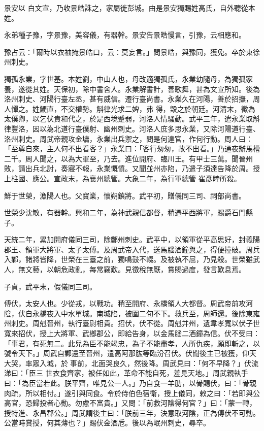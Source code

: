 \begin{pinyinscope}
 景安以
 白文宣，乃收景皓誅之，家屬徙彭城。由是景安獨賜姓高氏，自外聽從本姓。



 永弟種子豫，字景豫，美容儀，有器幹。景安告景皓慢言，引豫，云相應和。



 豫占云：「爾時以衣袖掩景皓口，云：莫妄言。」問景皓，與豫同，獲免。卒於東徐州刺史。



 獨孤永業，字世基。本姓劉，中山人也，母改適獨孤氏，永業幼隨母，為獨孤家養，遂從其姓。天保初，除中書舍人。永業解書計，善歌舞，甚為文宣所知。後為洛州刺史、河陽行臺左丞，甚有威信。遷行臺尚書。永業久在河陽，善於招撫，周人憚之。姓鯁直，不交權勢。斛律光求二婢，弗
 得，毀之於朝廷。河清末，徵為太僕卿，以乞伏貴和代之，於是西境蹙弱，河洛人情騷動。武平三年，遣永業取斛律豐洛，因以為北道行臺僕射、幽州刺史。河洛人庶多思永業，又除河陽道行臺、洛州刺史。周武帝親攻金墉，永業出兵禦之，問是何達官，作何行動。周人曰：「至尊自來，主人何不出看客？」永業曰：「客行匆匆，故不出看。」乃通夜辦馬槽二千。周人聞之，以為大軍至，乃去。進位開府、臨川王。有甲士三萬。聞晉州敗，請出兵北討，奏寢不報，永業慨憤。又聞並州亦陷，乃遣子須達告降於周。授上柱國、應公。宣政末，為襄州總管。大象二年，為行軍總管
 崔彥睦所殺。



 鮮于世榮，漁陽人也。父寶業，懷朔鎮將。武平初，贈儀同三司、祠部尚書。



 世榮少沈敏，有器幹。興和二年，為神武親信都督，稍遷平西將軍，賜爵石門縣子。



 天統二年，累加開府儀同三司，除鄭州刺史。武平中，以領軍從平高思好，封義陽郡王、領軍大將軍、太子太傅。及周武帝入代，送馬腦酒鐘與之，得便撞破。周兵入鄴，諸將皆降，世榮在三臺之前，獨鳴鼓不輟。及被執不屈，乃見殺。世榮雖武人，無文藝，以朝危政亂，每常竊歎。見徵稅無厭，賞賜過度，發言歎息焉。



 子貞，武平末，假儀同三司。



 傅伏，太安人也。少從戎，以戰功。稍至開府、永橋領人大都督。周武帝前攻河陰，伏自永橋夜入中水單城。南城陷，被圍二旬不下。救兵至，周師還。後除東雍州刺史。周剋晉州，執行臺尉相貴。招伏，伏不從。周剋并州，遺韋孝寬以伏子世寬來招伏，授上大將軍、武鄉郡公，即給告身，以金馬腦二酒鐘為信。伏不受曰：「事君，有死無二。此兒為臣不能竭忠，為子不能盡孝，人所仇疾，願即斬之，以號令天下。」周武自鄴還至晉州，遣高阿那肱等臨汾召伏。伏聞後主已被獲，仰天大哭，率眾入城，於事前，北面哭良久，然後降。周武見曰：「何不早降？」伏流涕曰：「臣三
 世衣食齊家，被任如此，革命不能自死，羞見天地。」周武親執手曰：「為臣當若此。朕平齊，唯見公一人。」乃自食一羊肋，以骨賜伏，曰：「骨親肉疏，所以相付。」遂引與同食。令於侍伯色宿衛，授上儀同，敕之曰：「若即與公高官，恐歸投者心動。勿慮不富貴。」又問：「前救河陰得何官？」曰：「蒙一轉，授特進、永昌郡公。」周武謂後主曰：「朕前三年，決意取河陰，正為傅伏不可動。公當時賞授，何其薄也？」賜伏金酒卮。後以為岷州刺史，尋卒。




\end{pinyinscope}
